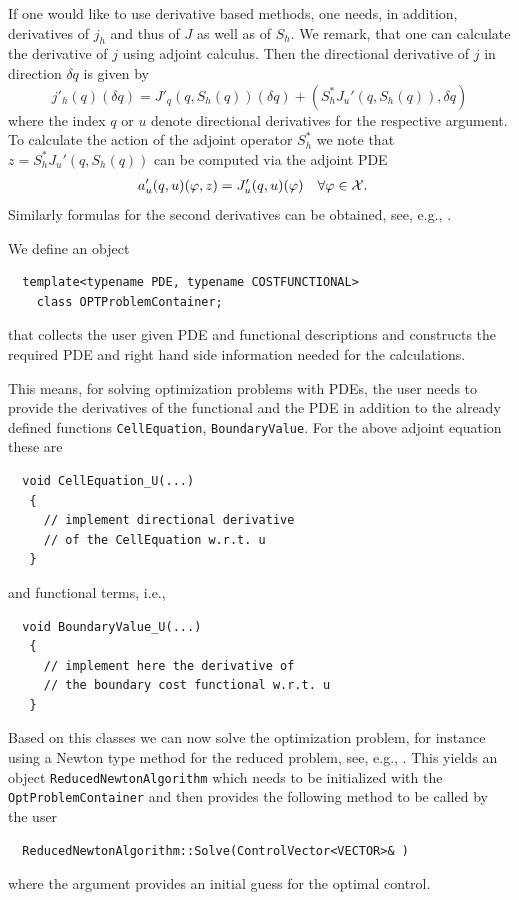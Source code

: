 \documentclass[smallextended]{svjour3}       %
\numberwithin{equation}{section}
\renewcommand{\phi}{\varphi}
\begin{document}
If one would like to use derivative based methods, one 
needs, in addition, derivatives of $j_h$ and thus of $J$ as well as of $S_h$. 
We remark, that one can calculate the derivative of 
$j$ using adjoint calculus. Then the directional derivative 
of $j$ in direction $\delta q$ is given by
\[
j'_h(q)(\delta q) = J'_q(q,S_h(q))(\delta q) + (S_h^* J_u'(q,S_h(q)),\delta q)
\]
where the index $q$ or $u$ denote directional derivatives for the 
respective argument. To calculate the action of the adjoint operator $S_h^*$ 
we note that $z =  S_h^* J_u'(q,S_h(q))$
can be computed via the adjoint PDE
\begin{equation}
  \label{opt_KKT_system}
  \begin{aligned}
    a_{u}'(q,u)(\phi , z) &= J'_{u}(q,u)(\phi) & \forall \phi&\in {\cal X}.
  \end{aligned}
\end{equation}
Similarly formulas for the second derivatives can be obtained, see, e.g., 
\cite{BeMeVe06}.

We define an object 
\begin{lstlisting} 
  template<typename PDE, typename COSTFUNCTIONAL>
    class OPTProblemContainer;
\end{lstlisting}
that collects the user given PDE and functional descriptions and constructs the 
required PDE and right hand side information needed for the calculations.

This means, for solving optimization problems with PDEs, the user needs to
provide the derivatives of the functional and the PDE 
in addition to the already defined functions \texttt{CellEquation}, 
\texttt{BoundaryValue}. For the above adjoint equation these are 
\begin{lstlisting} 
  void CellEquation_U(...)
   {
     // implement directional derivative 
     // of the CellEquation w.r.t. u
   }
\end{lstlisting}
and functional terms, i.e.,     
\begin{lstlisting} 
  void BoundaryValue_U(...)
   {
     // implement here the derivative of 
     // the boundary cost functional w.r.t. u
   }
\end{lstlisting}

Based on this classes we can now solve the optimization problem, for instance using 
a Newton type method for the reduced problem, see, e.g., \cite{NoWr00}. This yields 
an object \texttt{ReducedNewtonAlgorithm} which needs to be initialized 
with the \texttt{OptProblemContainer} and then provides 
the following method to be called by the user
\begin{lstlisting}
  ReducedNewtonAlgorithm::Solve(ControlVector<VECTOR>& )
\end{lstlisting}
where the argument provides an initial guess for the optimal control.
\end{document}
